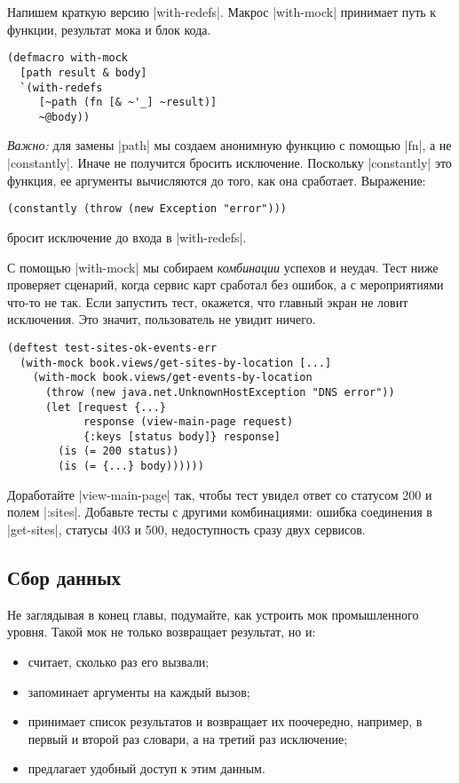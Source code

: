Напишем краткую версию \spverb|with-redefs|. Макрос \spverb|with-mock| принимает
путь к функции, результат мока и блок кода.

\begin{verbatim}
(defmacro with-mock
  [path result & body]
  `(with-redefs
     [~path (fn [& ~'_] ~result)]
     ~@body))
\end{verbatim}

\emph{Важно:} для замены \spverb|path| мы создаем анонимную функцию с помощью
\spverb|fn|, а не \spverb|constantly|. Иначе не получится бросить
исключение. Поскольку \spverb|constantly| это функция, ее аргументы вычисляются
до того, как она сработает. Выражение:

\begin{verbatim}
(constantly (throw (new Exception "error")))
\end{verbatim}

\noindent
бросит исключение до входа в \spverb|with-redefs|.

С помощью \spverb|with-mock| мы собираем \emph{комбинации} успехов и
неудач. Тест ниже проверяет сценарий, когда сервис карт сработал без ошибок, а с
мероприятиями что-то не так. Если запустить тест, окажется, что главный экран не
ловит исключения. Это значит, пользователь не увидит ничего.

\begin{verbatim}
(deftest test-sites-ok-events-err
  (with-mock book.views/get-sites-by-location [...]
    (with-mock book.views/get-events-by-location
      (throw (new java.net.UnknownHostException "DNS error"))
      (let [request {...}
            response (view-main-page request)
            {:keys [status body]} response]
        (is (= 200 status))
        (is (= {...} body))))))
\end{verbatim}

Доработайте \spverb|view-main-page| так, чтобы тест увидел ответ со статусом 200
и полем \spverb|:sites|. Добавьте тесты с другими комбинациями: ошибка
соединения в \spverb|get-sites|, статусы 403 и 500, недоступность сразу двух
сервисов.

\subsection{Сбор данных}

Не заглядывая в конец главы, подумайте, как устроить мок промышленного
уровня. Такой мок не только возвращает результат, но и:

\begin{itemize}

\item
  считает, сколько раз его вызвали;

\item
  запоминает аргументы на каждый вызов;

\item
  принимает список результатов и возвращает их поочередно, например, в первый и
  второй раз словари, а на третий раз исключение;

\item
  предлагает удобный доступ к этим данным.

\end{itemize}

